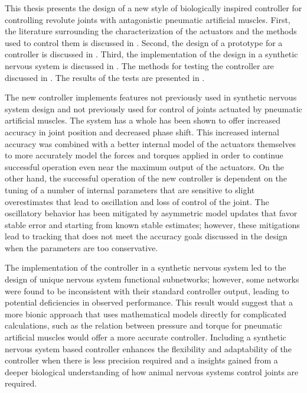 
This thesis presents the design of a new style of biologically inspired
controller for controlling revolute joints with antagonistic pneumatic
artificial muscles. First, the literature surrounding the characterization of
the actuators and the methods used to control them is discussed in
. Second, the
design of a prototype for a controller is discussed in
. Third, the implementation of the design in a
synthetic nervous system is discussed in . The methods
for testing the controller are discussed in . The results of
the tests are presented in .

The new controller implements features not previously used in synthetic nervous
system design and not previously used for control of joints actuated by
pneumatic artificial muscles. The system has a whole has been shown to offer
increased accuracy in joint position and decreased phase shift. This increased internal accuracy was
combined with a better internal model of the actuators themselves to more
accurately model the forces and torques applied in order to continue successful
operation even near the maximum output of the actuators. On the other hand, the
successful operation of the new controller is dependent on the tuning of a number of
internal parameters that are sensitive to slight overestimates that lead to
oscillation and loss of control of the joint. The oscillatory behavior has been mitigated by
asymmetric model updates that favor stable error and starting from known stable
estimates; however, these mitigations lead to tracking that does not meet the accuracy goals
discussed in the design when the parameters are too conservative.

The implementation of the controller in a synthetic nervous system led to the
design of unique nervous system functional subnetworks; however, some networks
were found to be inconsistent with their standard controller output, leading to
potential deficiencies in observed performance. This result would suggest that a more
bionic approach that uses mathematical models directly for complicated
calculations, such as the relation between pressure and torque for pneumatic
artificial muscles would offer a more accurate controller. Including a synthetic nervous system based controller enhances the flexibility and adaptability of the controller when there is less precision required and a insights gained from a deeper biological understanding of how animal nervous systems control joints are required.

